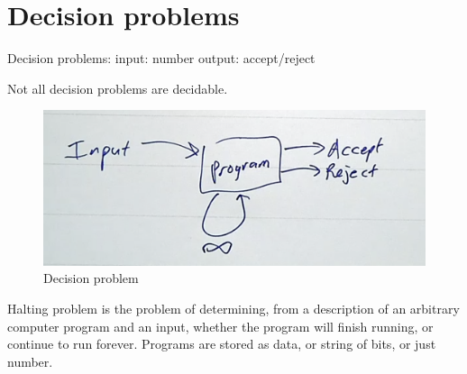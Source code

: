 \documentclass{article}
\begin{document}



\section{Decision problems} 

Decision problems:
input: number
output: accept/reject

Not all decision problems are decidable.
    \begin{figure}[h!]
		\begin{center}
			\includegraphics[scale=0.3]{images/fig1}
		\end{center}
		\caption{Decision problem}
	\end{figure}
Halting problem is the problem of determining, from a description of an arbitrary computer program and an input, whether the program will finish running, or continue to run forever.
Programs are stored as data, or string of bits, or just number.
\end{document}
